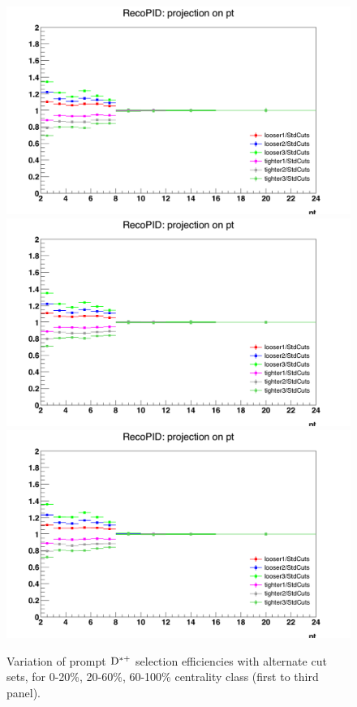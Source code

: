 \begin{figure}
\centering
{\includegraphics[width=0.48\linewidth]{figuresVsCent/Dstar/SystDcuts/RatioPromptEff1DMap_020_Lxy.png}}
{\includegraphics[width=0.48\linewidth]{figuresVsCent/Dstar/SystDcuts/RatioPromptEff1DMap_2060_Lxy.png}}
{\includegraphics[width=0.48\linewidth]{figuresVsCent/Dstar/SystDcuts/RatioPromptEff1DMap_60100_Lxy.png}}
\caption{Variation of prompt ${\rm D^{*+}}$ selection efficiencies with alternate cut sets, for 0-20\%, 20-60\%, 60-100\% centrality class (first to third panel).}
\label{fig:EffVariations_Dstar}
\end{figure}

